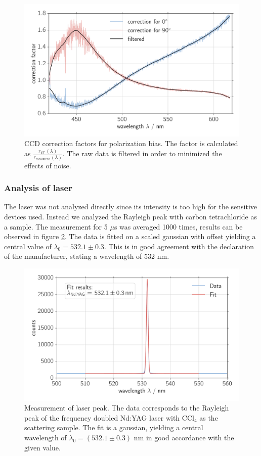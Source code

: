 \begin{figure}[htpb]
    \centering
    \includegraphics[width=0.8\linewidth]{analysis/figures/ccd_correction}
    \caption{CCD correction factors for polarization bias. The factor is calculated as 
        $\frac{r_{45^\circ}(\lambda)}{r_\text{measured}(\lambda)}$. The raw data is filtered in order to minimized 
    the effects of noise.}
    \label{fig:ccd_correction}
\end{figure}

\subsubsection{Analysis of laser}
\label{sec:laser}
The laser was not analyzed directly since its intensity is too high for the sensitive devices used. Instead we 
analyzed the Rayleigh peak with carbon tetrachloride as a sample. The measurement for 5 $\mu$s was averaged 1000
times, results can be observed in figure \ref{fig:ccd_laser_peak}. The data is fitted on a scaled gaussian with 
offset yielding a central value of $\lambda_0 = 532.1 \pm 0.3$. This is in good agreement with the declaration 
of the manufacturer, stating a wavelength of 532 nm. 


\begin{figure}[htpb]
    \centering
    \includegraphics[width=0.8\linewidth]{analysis/figures/ccd_laser_peak}
    \caption{Measurement of laser peak. The data corresponds to the Rayleigh peak of the frequency doubled Nd:YAG 
    laser with CCl$_4$ as the scattering sample. The fit is a gaussian, yielding a central wavelength of 
$\lambda_0 = (532.1 \pm 0.3)$ nm in good accordance with the given value. }
    \label{fig:ccd_laser_peak}
\end{figure}

